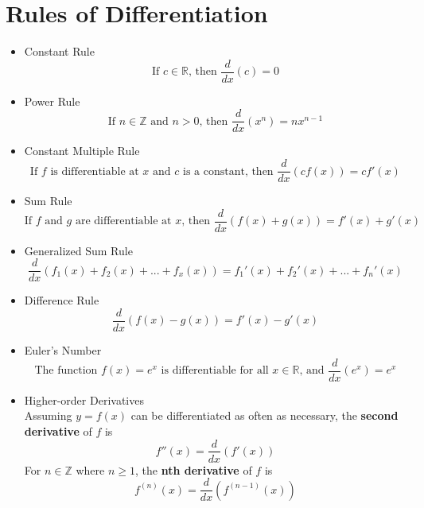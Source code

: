 \documentclass{article}
\begin{document}
\section*{Rules of Differentiation}
\begin{itemize}
    \item Constant Rule
    $$\text{If } c \in \mathbb{R} \text{, then } \frac{d}{dx}\left(c\right) = 0$$
    \item Power Rule
    $$\text{If } n \in \mathbb{Z} \text{ and } n > 0 \text{, then } \frac{d}{dx}\left(x^n\right) = nx^{n - 1}$$
    \item Constant Multiple Rule
    $$\text{If } f \text{ is differentiable at } x \text{ and } c \text{ is a constant, then } \frac{d}{dx}\left(cf(x)\right) = cf'\left(x\right)$$
    \item Sum Rule
    $$\text{If } f \text{ and } g \text{ are differentiable at } x \text{, then } \frac{d}{dx}\left(f(x) + g(x)\right) = f'(x) + g'(x)$$
    \item Generalized Sum Rule
    $$\frac{d}{dx}\left(f_1(x) + f_2(x) + ... + f_x(x)\right) = f_1'(x) + f_2'(x) + ... + f_n'(x)$$
    \item Difference Rule
    $$\frac{d}{dx}\left(f(x) - g(x)\right) = f'(x) - g'(x)$$
    \item Euler's Number
        $$\text{The function } f(x) = e^x \text{ is differentiable for all } x \in \mathbb{R} \text{, and } \frac{d}{dx}\left(e^x\right) = e^x$$
    \item Higher-order Derivatives
    \\ Assuming $y = f(x)$ can be differentiated as often as necessary, the \textbf{second derivative} of $f$ is
    $$f''(x) = \frac{d}{dx}\left(f'(x)\right)$$
    For $n \in \mathbb{Z}$ where $n \geq 1$, the \textbf{nth derivative} of $f$ is
    $$f^{(n)}\left(x\right) = \frac{d}{dx}\left(f^{(n - 1)}\left(x\right)\right)$$
\end{itemize}
\end{document}
